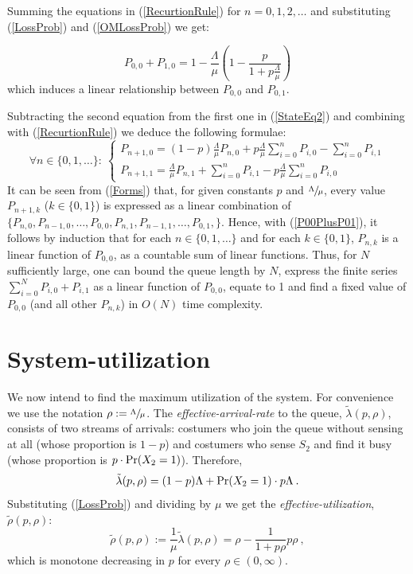 \documentclass[11pt]{article}
\numberwithin{equation}{section}
\newcommand{\pr}{{\rm Pr}}
\begin{document}
Summing the equations in (\ref{RecurtionRule}) for $n=0,1,2,\ldots$ and substituting (\ref{LossProb}) and (\ref{OMLossProb}) we get:

\begin{equation}
	P_{0,0} + P_{1,0} = 1- \frac{ \Lambda}{ \mu}\left(1- \frac{p}{1+p \frac{\Lambda}{\mu}} \right) \label{P00PlusP01}
\end{equation}
which induces a linear relationship between $P_{0,0}$ and $P_{0,1}$.

Subtracting the second equation from the first one in (\ref{StateEq2}) and combining with (\ref{RecurtionRule}) we deduce the following formulae:
\begin{equation}
	\forall n \in \lbrace 0, 1, \ldots \rbrace: \
  	\begin{cases}
    	P_{n+1,0} = (1-p) \frac{\Lambda}{\mu} P_{n, 0} + p \frac{\Lambda}{\mu} \sum\limits_{i=0}^{n}P_{i,0} - \sum\limits_{i=0}^{n}P_{i,1}\\
   	 	P_{n+1,1} = \frac{\Lambda}{\mu} P_{n, 1} + \sum\limits_{i=0}^{n}P_{i,1} - p \frac{\Lambda}{\mu} \sum\limits_{i=0}^{n}P_{i,0}
  	\end{cases} \label{Forms}
\end{equation}
It can be seen from (\ref{Forms}) that, for given constants $p$ and $\sfrac{\Lambda}{\mu}$, every value $P_{n+1,k}$ ($k\in\lbrace0,1\rbrace$) is expressed as a linear combination of $\lbrace P_{n,0}, P_{n-1,0}, \ldots, P_{0,0}, P_{n,1}, P_{n-1,1}, \ldots, P_{0,1},  \rbrace$. Hence, with (\ref{P00PlusP01}), it follows by induction that for each $n \in \lbrace 0, 1, \ldots \rbrace$ and for each $k \in \lbrace 0, 1 \rbrace$, $P_{n,k}$ is a linear function of $P_{0,0}$, as a countable sum of linear functions. Thus, for $N$ sufficiently large, one can bound the queue length by $N$, express the finite series $\sum_{i=0}^{N} P_{i,0}+P_{i,1}$ as a linear function of $P_{0,0}$, equate to 1 and find a fixed value of $P_{0,0}$ (and all other $P_{n,k}$) in $O(N)$ time complexity.
\newpage

\section{System-utilization}
We now intend to find the maximum utilization of the system. For convenience we use the notation $\rho:=\sfrac{\Lambda}{\mu}$. The {\it effective-arrival-rate} to the queue, $\tilde{\lambda}(p,\rho)$, consists of two streams of arrivals: costumers who join the queue without sensing at all (whose proportion is $1-p$) and costumers who sense $S_{2}$ and find it busy (whose proportion is $p \cdot \pr(X_2=1)$). Therefore,
\[ \tilde{\lambda}(p,\rho) = (1-p)\Lambda + \pr(X_2=1)\cdot p \Lambda\:. \]
Substituting (\ref{LossProb}) and dividing by $\mu$ we get the {\it effective-utilization}, $\tilde{\rho}(p,\rho)$:
\begin{equation}
\tilde{\rho}(p,\rho) := \frac{1}{\mu}\tilde{\lambda}(p,\rho) = \rho - \frac{1}{1+p\rho}p\rho\:, \label{EffectiveUtil}
\end{equation}
which is monotone decreasing in $p$ for every $\rho\in(0,\infty)$. 
\end{document}
